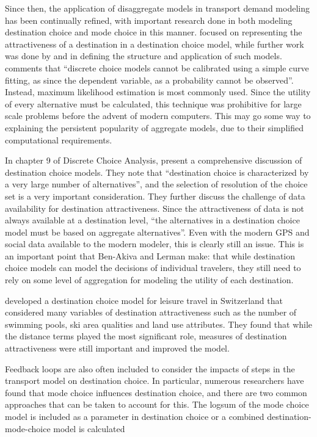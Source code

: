 Since then, the application of disaggregate models in transport demand modeling has been continually refined, with important research done in both modeling destination choice and mode choice in this manner. \textcite{Daly82} focused on representing the attractiveness of a destination in a destination choice model, while further work was done by \textcite{Akiva74} and \textcite{Anas81} in defining the structure and application of such models. \textcite{Train09} comments that \enquote{discrete choice models cannot be calibrated using a simple curve fitting, as since the dependent variable, as a probability cannot be observed}. Instead, maximum likelihood estimation is most commonly used. Since the utility of every alternative must be calculated, this technique was prohibitive for large scale problems before the advent of modern computers. This may go some way to explaining the persistent popularity of aggregate models, due to their simplified computational requirements.

In chapter 9 of Discrete Choice Analysis, \textcite{AkivaLerman85} present a comprehensive discussion of destination choice models. They note that \enquote{destination choice is characterized by a very large number of alternatives}, and the selection of resolution of the choice set is a very important consideration. They further discuss the challenge of data availability for destination attractiveness. Since the attractiveness of data is not always available at a destination level, \enquote{the alternatives in a destination choice model must be based on aggregate alternatives}. Even with the modern GPS and social data available to the modern modeler, this is clearly still an issue. This is an important point that Ben-Akiva and Lerman make: that while destination choice models can model the decisions of individual travelers, they still need to rely on some level of aggregation for modeling the utility of each destination.

\textcite{simma2001destination} developed a destination choice model for leisure travel in Switzerland that considered many variables of destination attractiveness such as the number of swimming pools, ski area qualities and land use attributes. They found that while the distance terms played the most significant role, measures of destination attractiveness were still important and improved the model. 

Feedback loops are also often included to consider the impacts of steps in the transport model on destination choice. In particular, numerous researchers have found that mode choice influences destination choice, and there are two common approaches that can be taken to account for this. The logsum of the mode choice model is included as a parameter in destination choice \parencite{jonnalagadda2001development, mishra2011functional} or a combined destination-mode-choice model is calculated \parencite{newman2010hierarchical, adler1976joint, boyce1983implementation, Outwater15}

